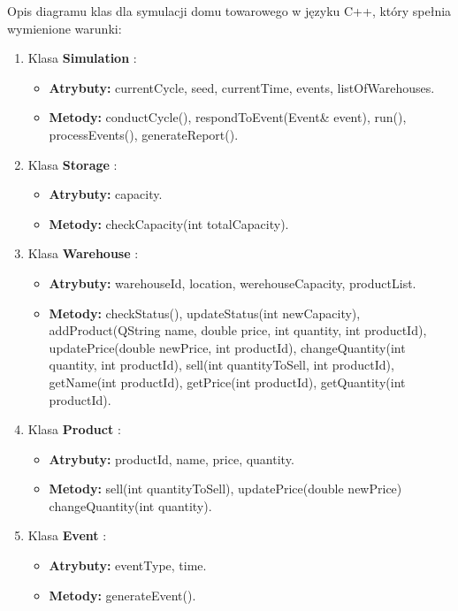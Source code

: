 \documentclass[11pt]{article}
\begin{document}
Opis diagramu klas dla symulacji domu towarowego w języku C++, który spełnia wymienione warunki:

\begin{enumerate}

    \item Klasa \textbf{Simulation} :
    \begin{itemize}
        \item \textbf{Atrybuty:} currentCycle, seed, currentTime, events, listOfWarehouses.
        \item \textbf{Metody:} conductCycle(), respondToEvent(Event\& event), run(), processEvents(), generateReport().
    \end{itemize}

    \item Klasa \textbf{Storage} :
    \begin{itemize}
        \item \textbf{Atrybuty:} capacity.
        \item \textbf{Metody:} checkCapacity(int totalCapacity).
    \end{itemize}

    \item Klasa \textbf{Warehouse} :
    \begin{itemize}
        \item \textbf{Atrybuty:} warehouseId, location, werehouseCapacity, productList.
        \item \textbf{Metody:} checkStatus(), updateStatus(int newCapacity), addProduct(QString name, double price, int quantity, int productId), updatePrice(double newPrice, int productId), changeQuantity(int quantity, int productId), sell(int quantityToSell, int productId), getName(int productId), getPrice(int productId), getQuantity(int productId).
    \end{itemize}

    \item Klasa \textbf{Product} :
    \begin{itemize}
        \item \textbf{Atrybuty:} productId, name, price, quantity.
        \item \textbf{Metody:} sell(int quantityToSell), updatePrice(double newPrice)
        changeQuantity(int quantity).
    \end{itemize}

    \item Klasa \textbf{Event} :
    \begin{itemize}
        \item \textbf{Atrybuty:} eventType, time.
        \item \textbf{Metody:} generateEvent().
    \end{itemize}


\end{enumerate}
\end{document}
